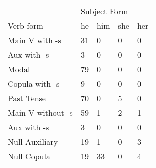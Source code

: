 \begin{table}[]
\begin{minipage}{0.5\textwidth}
\end{minipage}
\begin{minipage}{0.5\textwidth}
    \centering
    \begin{tabular}{@{}lllll@{}}
        \toprule
            &\multicolumn{4}{l}{Subject Form}\\
            \cline{2-5}
        Verb form & he & him & she & her \\
        \midrule
        Main V with -s & 31 & 0 & 0 & 0 \\
        Aux with -s & 3 & 0 & 0 & 0 \\
        Modal & 79 & 0 & 0 & 0 \\
        Copula with -s & 9 & 0 & 0 & 0 \\
        Past Tense & 70 & 0 & 5 & 0 \\
        \hline
        Main V without -s & 59 & 1 & 2 & 1 \\
        Aux with -s & 3 & 0 & 0 & 0 \\
        Null Auxiliary & 19 & 1 & 0 & 3 \\
        Null Copula & 19 & 33 & 0 & 4 \\
        \bottomrule
    \end{tabular}
    \end{minipage}
\end{table}

